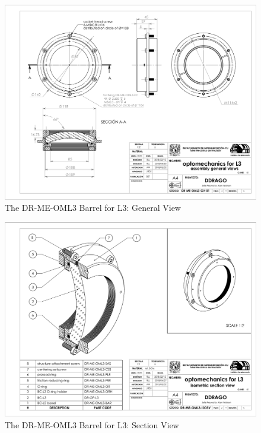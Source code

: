 \documentclass{article}
\begin{document}
\begin{figure}
\begin{center}
\includegraphics[height=\linewidth,angle=90]{figures/DR-ME-OML3-GV-01}
\end{center}
\caption{The DR-ME-OML3 Barrel for L3: General View}
\label{figure:rosalia-oml3-general}
\end{figure}

\begin{figure}
\begin{center}
\includegraphics[height=\linewidth,angle=90]{figures/DR-ME-OML3-ISOSV}
\end{center}
\caption{The DR-ME-OML3 Barrel for L3: Section View}
\label{figure:rosalia-oml3-section}
\end{figure}
\end{document}
